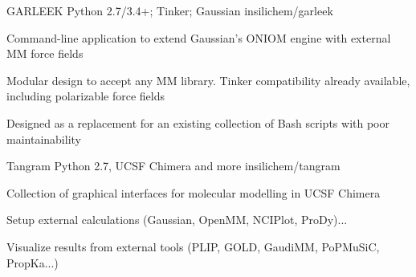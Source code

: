 \begin{cventries}
  \projectentry
    {GARLEEK} %
    {Python 2.7/3.4+; Tinker; Gaussian} %
    {} %
    {insilichem/garleek} %
    {
      \begin{cvitems} %
        \item {Command-line application to extend Gaussian's ONIOM engine with external MM force fields}
        \item {Modular design to accept any MM library. Tinker compatibility already available, including polarizable force fields}
        \item {Designed as a replacement for an existing collection of Bash scripts with poor maintainability}
      \end{cvitems}
    }

  \projectentry
    {Tangram} %
    {Python 2.7, UCSF Chimera and more} %
    {} %
    {insilichem/tangram} %
    {
      \begin{cvitems} %
        \item {Collection of graphical interfaces for molecular modelling in UCSF Chimera}
        \item {Setup external calculations (Gaussian, OpenMM, NCIPlot, ProDy)...}
        \item {Visualize results from external tools (PLIP, GOLD, GaudiMM, PoPMuSiC, PropKa...)}
      \end{cvitems}
    }
\end{cventries}
